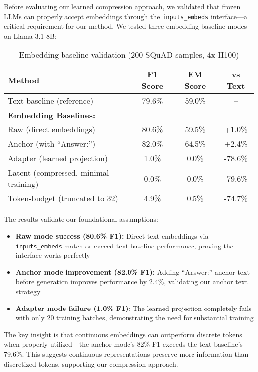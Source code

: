 \documentclass{article}
\begin{document}
Before evaluating our learned compression approach, we validated that frozen LLMs can properly accept embeddings through the \texttt{inputs\_embeds} interface—a critical requirement for our method. We tested three embedding baseline modes on Llama-3.1-8B:

\begin{table}[h]
\caption{Embedding baseline validation (200 SQuAD samples, 4x H100)}
\label{tab:embedding_validation}
\vskip 0.15in
\begin{center}
\begin{small}
\begin{tabular}{lccc}
\toprule
Method & F1 Score & EM Score & vs Text \\
\midrule
Text baseline (reference) & 79.6\% & 59.0\% & -- \\
\midrule
\textbf{Embedding Baselines:} & & & \\
Raw (direct embeddings) & 80.6\% & 59.5\% & +1.0\% \\
Anchor (with ``Answer:'') & 82.0\% & 64.5\% & +2.4\% \\
Adapter (learned projection) & 1.0\% & 0.0\% & -78.6\% \\
\midrule
Latent (compressed, minimal training) & 0.0\% & 0.0\% & -79.6\% \\
Token-budget (truncated to 32) & 4.9\% & 0.5\% & -74.7\% \\
\bottomrule
\end{tabular}
\end{small}
\end{center}
\vskip -0.1in
\end{table}

The results validate our foundational assumptions:
\begin{itemize}
\item \textbf{Raw mode success (80.6\% F1):} Direct text embeddings via \texttt{inputs\_embeds} match or exceed text baseline performance, proving the interface works perfectly
\item \textbf{Anchor mode improvement (82.0\% F1):} Adding ``Answer:'' anchor text before generation improves performance by 2.4\%, validating our anchor text strategy
\item \textbf{Adapter mode failure (1.0\% F1):} The learned projection completely fails with only 20 training batches, demonstrating the need for substantial training
\end{itemize}

The key insight is that continuous embeddings can outperform discrete tokens when properly utilized—the anchor mode's 82\% F1 exceeds the text baseline's 79.6\%. This suggests continuous representations preserve more information than discretized tokens, supporting our compression approach.
\end{document}
